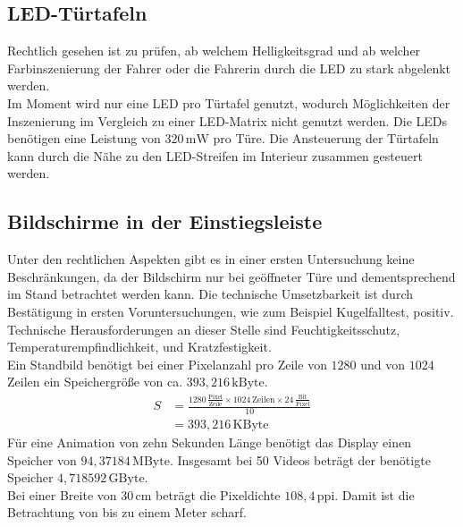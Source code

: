 \subsection{LED-Türtafeln}
Rechtlich gesehen ist zu prüfen, ab welchem Helligkeitsgrad und ab welcher Farbinszenierung der Fahrer oder die Fahrerin durch die LED zu stark abgelenkt werden. \\
Im Moment wird nur eine LED pro Türtafel genutzt, wodurch Möglichkeiten der Inszenierung im Vergleich zu einer LED-Matrix nicht genutzt werden. 
Die LEDs benötigen eine Leistung von $ 320\,\mathrm{mW} $ pro Türe.
Die Ansteuerung der Türtafeln kann durch die Nähe zu den LED-Streifen im Interieur zusammen gesteuert werden.
\subsection{Bildschirme in der Einstiegsleiste}
Unter den rechtlichen Aspekten gibt es in einer ersten Untersuchung keine Beschränkungen, da der Bildschirm nur bei geöffneter Türe und dementsprechend im Stand betrachtet werden kann.
Die technische Umsetzbarkeit ist durch Bestätigung in ersten Voruntersuchungen, wie zum Beispiel Kugelfalltest, positiv. Technische Herausforderungen an dieser Stelle sind Feuchtigkeitsschutz, Temperaturempfindlichkeit, und Kratzfestigkeit. \\
Ein Standbild benötigt bei einer Pixelanzahl pro Zeile von $ 1280 $ und von $ 1024 $ Zeilen ein Speichergröße von ca. $ 393,216\,\mathrm{kByte}$. 
\begin{align}
	S &= \frac{1280\,\frac{\mathrm{Pixel}}{\mathrm{Zeile}}\times 1024\,\mathrm{Zeilen} \times 24\,\frac{\mathrm{Bit}}{\mathrm{Pixel}}}{10} \\
	&= 393,216\,\mathrm{KByte}
\end{align}
Für eine Animation von zehn Sekunden Länge benötigt das Display einen Speicher von $ 94,37184\,\mathrm{MByte}$.
Insgesamt bei 50 Videos beträgt der benötigte Speicher $ 4,718592\,\mathrm{GByte}$. \\
Bei einer Breite von $ 30\,\mathrm{cm} $ beträgt die Pixeldichte $ 108,4\,\mathrm{ppi} $. Damit ist die Betrachtung von bis zu einem Meter scharf.
